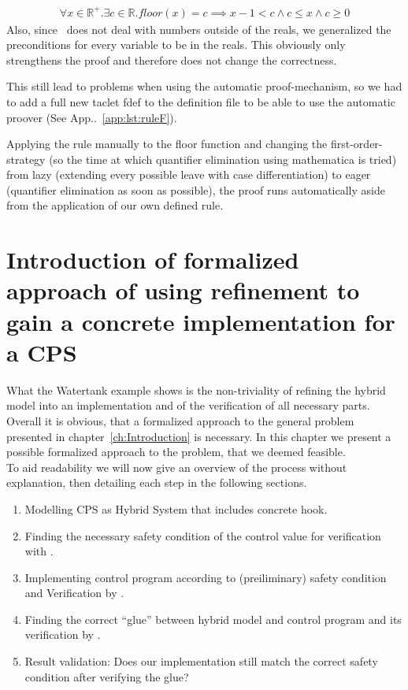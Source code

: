\begin{align*}
		\forall x \in \mathbb{R^{+}}. \exists c \in \mathbb{R}. floor(x) = c \implies x-1 < c \wedge c \leq x \wedge c \geq 0
	\label{eq:approxF}
\end{align*}
Also, since \keym~does not deal with numbers outside of the reals, we generalized the preconditions for every variable to be in the reals. This obviously only strengthens the proof and therefore does not change the correctness.

This still lead to problems when using the automatic proof-mechanism, so we had to add a full new taclet fdef to the definition file to be able to use the automatic proover (See App..~\ref{app:lst:ruleF}).

Applying the rule manually to the floor function and changing the first-order-strategy (so the time at which quantifier elimination using mathematica is tried) from lazy (extending every possible leave with case differentiation) to eager (quantifier elimination as soon as possible), the proof runs automatically aside from the application of our own defined rule.

\chapter{Introduction of formalized approach of using refinement to gain a concrete implementation for a CPS}
\label{ch:Process}

What the Watertank example shows is the non-triviality of refining the hybrid model into an implementation and of the verification of all necessary parts. Overall it is obvious, that a formalized approach to the general problem presented in chapter~\ref{ch:Introduction} is necessary. In this chapter we present a possible formalized approach to the problem, that we deemed feasible.
\\


To aid readability we will now give an overview of the process without explanation, then detailing each step in the following sections. 

\begin{enumerate}
	\item Modelling CPS as Hybrid System that includes concrete hook.
	\item Finding the necessary safety condition of the control value for verification with \keym.
	\item Implementing control program according to (preiliminary) safety condition and Verification by \key.		
	\item Finding the correct ``glue'' between hybrid model and control program and its verification by \keym.
	\item Result validation: Does our implementation still match the correct safety condition after verifying the glue?
\end{enumerate}

